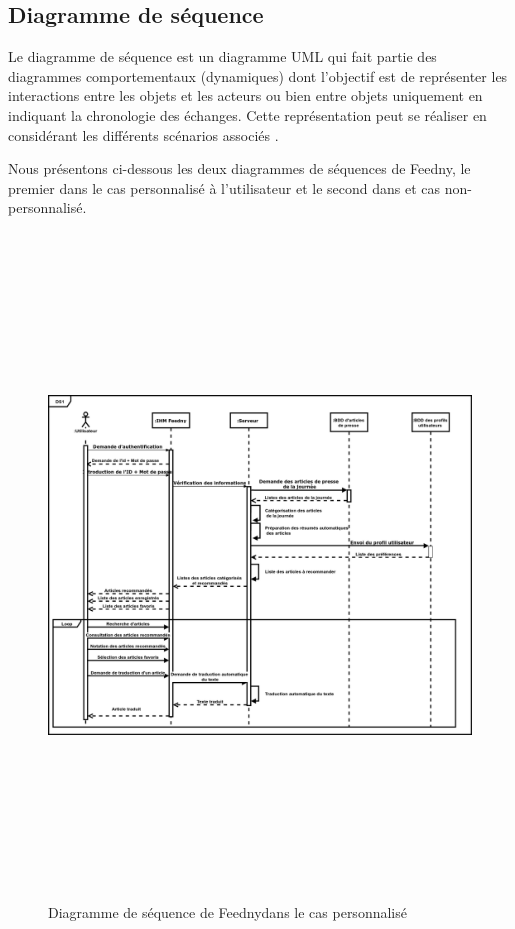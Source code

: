 \subsection{Diagramme de séquence}
Le diagramme de séquence est un diagramme UML qui fait partie des diagrammes comportementaux (dynamiques) dont l'objectif est de représenter les interactions entre les objets et les acteurs ou bien entre objets uniquement en indiquant la chronologie des échanges. Cette représentation peut se réaliser en considérant les différents scénarios associés \cite{UML}.

Nous présentons ci-dessous les deux diagrammes de séquences de \textquotedbl Feedny\textquotedbl, le premier dans le cas personnalisé à l'utilisateur et le second dans et cas non-personnalisé.
\begin{figure}[H]
    \centering
    \includegraphics[height=500pt,width=425pt]{img/chapter3/diagseqperso.png}
    \caption{Diagramme de séquence de \textquotedbl Feedny\textquotedbl dans le cas personnalisé}
\end{figure}


